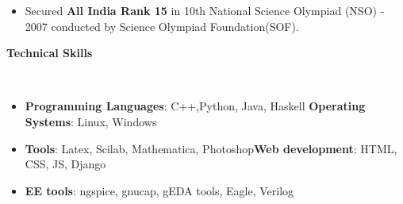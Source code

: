 \documentclass[a4paper,11pt]{article}
\newcommand{\lsep}{-0.5cm}
\newcommand{\resheading}[1]{{\small \colorbox{mygrey}{\begin{minipage}{0.975\textwidth}{\textbf{#1 \vphantom{p\^{E}}}}\end{minipage}}}}
\begin{document}
\begin{itemize}
  \item Secured \textbf{All India Rank 15} in 10th National Science Olympiad (NSO) - 2007 conducted by Science Olympiad Foundation(SOF).
\end{itemize}

\resheading{\textbf{\large Technical Skills}}\\[\lsep]
\begin{itemize}
   \item \textbf{Programming Languages}: C++,Python, Java, Haskell \hfill \textbf{Operating Systems}: Linux, Windows\\[-0.6cm]
   \item \textbf{Tools}: Latex, Scilab, Mathematica, Photoshop\hfill \textbf{Web development}: HTML, CSS, JS, Django\\[-0.6cm]
  \item \textbf{EE tools}: ngspice, gnucap,  gEDA tools, Eagle, Verilog %
\end{itemize}
\end{document}
